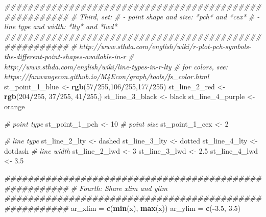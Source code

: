 \documentclass[
]{book}
\newenvironment{Shaded}{\begin{snugshade}}{\end{snugshade}}
\newcommand{\CommentTok}[1]{\textcolor[rgb]{0.56,0.35,0.01}{\textit{#1}}}
\newcommand{\DecValTok}[1]{\textcolor[rgb]{0.00,0.00,0.81}{#1}}
\newcommand{\FloatTok}[1]{\textcolor[rgb]{0.00,0.00,0.81}{#1}}
\newcommand{\KeywordTok}[1]{\textcolor[rgb]{0.13,0.29,0.53}{\textbf{#1}}}
\newcommand{\NormalTok}[1]{#1}
\newcommand{\OperatorTok}[1]{\textcolor[rgb]{0.81,0.36,0.00}{\textbf{#1}}}
\newcommand{\StringTok}[1]{\textcolor[rgb]{0.31,0.60,0.02}{#1}}
\begin{document}
\begin{Shaded}
\begin{Highlighting}[]
\CommentTok{\#\#\#\#\#\#\#\#\#\#\#\#\#\#\#\#\#\#\#\#\#\#\#\#\#\#\#\#\#\#\#\#\#\#\#\#\#\#\#\#\#\#\#\#\#\#\#\#\#\#\#\#\#\#\#}
\CommentTok{\# Third, set:}
\CommentTok{\# {-} point shape and size: *pch* and *cex*}
\CommentTok{\# {-} line type and width: *lty* and *lwd*}
\CommentTok{\#\#\#\#\#\#\#\#\#\#\#\#\#\#\#\#\#\#\#\#\#\#\#\#\#\#\#\#\#\#\#\#\#\#\#\#\#\#\#\#\#\#\#\#\#\#\#\#\#\#\#\#\#\#\#}
\CommentTok{\# http://www.sthda.com/english/wiki/r{-}plot{-}pch{-}symbols{-}the{-}different{-}point{-}shapes{-}available{-}in{-}r}
\CommentTok{\# http://www.sthda.com/english/wiki/line{-}types{-}in{-}r{-}lty}
\CommentTok{\# for colors, see: https://fanwangecon.github.io/M4Econ/graph/tools/fs\_color.html}
\NormalTok{st\_point\_}\DecValTok{1}\NormalTok{\_blue \textless{}{-}}\StringTok{ }\KeywordTok{rgb}\NormalTok{(}\DecValTok{57}\OperatorTok{/}\DecValTok{255}\NormalTok{,}\DecValTok{106}\OperatorTok{/}\DecValTok{255}\NormalTok{,}\DecValTok{177}\OperatorTok{/}\DecValTok{255}\NormalTok{)}
\NormalTok{st\_line\_}\DecValTok{2}\NormalTok{\_red \textless{}{-}}\StringTok{ }\KeywordTok{rgb}\NormalTok{(}\DecValTok{204}\OperatorTok{/}\DecValTok{255}\NormalTok{, }\DecValTok{37}\OperatorTok{/}\DecValTok{255}\NormalTok{, }\DecValTok{41}\OperatorTok{/}\DecValTok{255}\NormalTok{,)}
\NormalTok{st\_line\_}\DecValTok{3}\NormalTok{\_black \textless{}{-}}\StringTok{ \textquotesingle{}black\textquotesingle{}}
\NormalTok{st\_line\_}\DecValTok{4}\NormalTok{\_purple \textless{}{-}}\StringTok{ \textquotesingle{}orange\textquotesingle{}}

\CommentTok{\# point type}
\NormalTok{st\_point\_}\DecValTok{1}\NormalTok{\_pch \textless{}{-}}\StringTok{ }\DecValTok{10}
\CommentTok{\# point size}
\NormalTok{st\_point\_}\DecValTok{1}\NormalTok{\_cex \textless{}{-}}\StringTok{ }\DecValTok{2}

\CommentTok{\# line type}
\NormalTok{st\_line\_}\DecValTok{2}\NormalTok{\_lty \textless{}{-}}\StringTok{ \textquotesingle{}dashed\textquotesingle{}}
\NormalTok{st\_line\_}\DecValTok{3}\NormalTok{\_lty \textless{}{-}}\StringTok{ \textquotesingle{}dotted\textquotesingle{}}
\NormalTok{st\_line\_}\DecValTok{4}\NormalTok{\_lty \textless{}{-}}\StringTok{ \textquotesingle{}dotdash\textquotesingle{}}
\CommentTok{\# line width}
\NormalTok{st\_line\_}\DecValTok{2}\NormalTok{\_lwd \textless{}{-}}\StringTok{ }\DecValTok{3}
\NormalTok{st\_line\_}\DecValTok{3}\NormalTok{\_lwd \textless{}{-}}\StringTok{ }\FloatTok{2.5}
\NormalTok{st\_line\_}\DecValTok{4}\NormalTok{\_lwd \textless{}{-}}\StringTok{ }\FloatTok{3.5}

\CommentTok{\#\#\#\#\#\#\#\#\#\#\#\#\#\#\#\#\#\#\#\#\#\#\#\#\#\#\#\#\#\#\#\#\#\#\#\#\#\#\#\#\#\#\#\#\#\#\#\#\#\#\#\#\#\#\#}
\CommentTok{\# Fourth: Share xlim and ylim}
\CommentTok{\#\#\#\#\#\#\#\#\#\#\#\#\#\#\#\#\#\#\#\#\#\#\#\#\#\#\#\#\#\#\#\#\#\#\#\#\#\#\#\#\#\#\#\#\#\#\#\#\#\#\#\#\#\#\#}
\NormalTok{ar\_xlim =}\StringTok{ }\KeywordTok{c}\NormalTok{(}\KeywordTok{min}\NormalTok{(x), }\KeywordTok{max}\NormalTok{(x))}
\NormalTok{ar\_ylim =}\StringTok{ }\KeywordTok{c}\NormalTok{(}\OperatorTok{{-}}\FloatTok{3.5}\NormalTok{, }\FloatTok{3.5}\NormalTok{)}


\end{Highlighting}
\end{Shaded}
\end{document}
